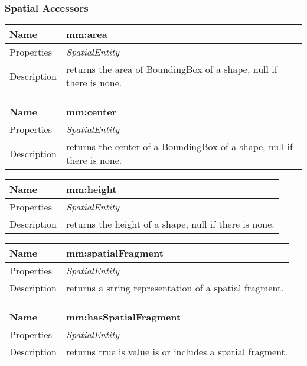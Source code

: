\subsubsection*{Spatial Accessors}
\begin{tabular}{|p{3cm}|p{10cm}|}
\hline Name & mm:area\\
\hline Properties & \textit{SpatialEntity} \\
\hline Description & returns the area of BoundingBox of a shape, null if there is none.\\
\hline
\end{tabular}
\vspace{0.3cm}
\newline
\begin{tabular}{|p{3cm}|p{10cm}|}
\hline Name & mm:center\\
\hline Properties & \textit{SpatialEntity} \\
\hline Description & returns the center of a BoundingBox of a shape, null if there is none.\\
\hline
\end{tabular}
\vspace{0.3cm}
\newline
\begin{tabular}{|p{3cm}|p{10cm}|}
\hline Name & mm:height\\
\hline Properties & \textit{SpatialEntity} \\
\hline Description & returns the height of a shape, null if there is none.\\
\hline
\end{tabular}
\vspace{0.3cm}
\newline
\begin{tabular}{|p{3cm}|p{10cm}|}
\hline Name & mm:spatialFragment\\
\hline Properties & \textit{SpatialEntity} \\
\hline Description & returns a string representation of a spatial fragment.\\
\hline
\end{tabular}
\vspace{0.3cm}
\newline
\begin{tabular}{|p{3cm}|p{10cm}|}
\hline Name & mm:hasSpatialFragment\\
\hline Properties & \textit{SpatialEntity} \\
\hline Description & returns true is value is or includes a spatial fragment.\\
\hline
\end{tabular}
